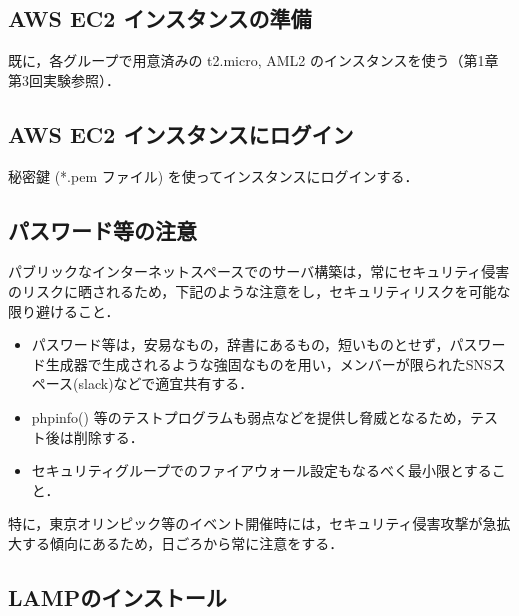 \subsection{AWS EC2 インスタンスの準備}

既に，各グループで用意済みの t2.micro, AML2 のインスタンスを使う（第1章第3回実験参照）．

\subsection{AWS EC2 インスタンスにログイン}

秘密鍵 (*.pem ファイル) を使ってインスタンスにログインする．


\subsection{パスワード等の注意}

パブリックなインターネットスペースでのサーバ構築は，常にセキュリティ侵害のリスクに晒されるため，下記のような注意をし，セキュリティリスクを可能な限り避けること．

\begin{itemize}
    \item パスワード等は，安易なもの，辞書にあるもの，短いものとせず，パスワード生成器で生成されるような強固なものを用い，メンバーが限られたSNSスペース(slack)などで適宜共有する．
    \item phpinfo() 等のテストプログラムも弱点などを提供し脅威となるため，テスト後は削除する．
    \item セキュリティグループでのファイアウォール設定もなるべく最小限とすること．
\end{itemize}

特に，東京オリンピック等のイベント開催時には，セキュリティ侵害攻撃が急拡大する傾向にあるため，日ごろから常に注意をする．

\subsection{LAMPのインストール}

